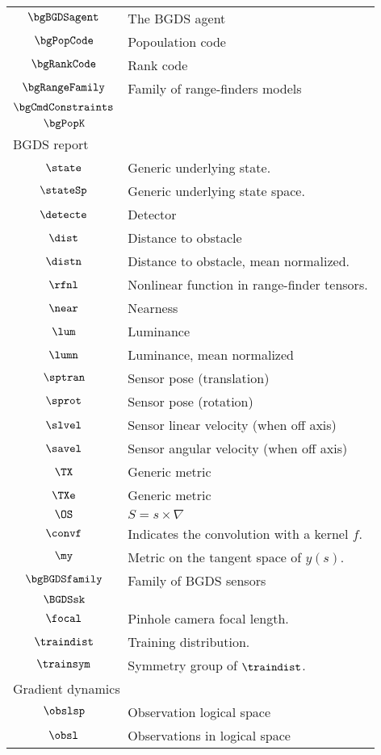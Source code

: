 \begin{longtable}{cl}
 $\bgBGDSagent$ &  The BGDS agent\\ 
 $\bgPopCode$ &  Popoulation code\\ 
 $\bgRankCode$ &  Rank code\\ 
 $\bgRangeFamily$ &  Family of range-finders models\\ 
 $\bgCmdConstraints$ & \\ 
 $\bgPopK$ & \\ 
 \multicolumn{2}{l}{BGDS report}\\ 
 \hline
$\state$ &  Generic underlying state.\\ 
 $\stateSp$ &  Generic underlying state space.\\ 
 $\detecte$ &  Detector\\ 
 $\dist$ &  Distance to obstacle\\ 
 $\distn$ &  Distance to obstacle, mean normalized.\\ 
 $\rfnl$ &  Nonlinear function in range-finder tensors.\\ 
 $\near$ &  Nearness\\ 
 $\lum$ &  Luminance\\ 
 $\lumn$ &  Luminance, mean normalized\\ 
 $\sptran$ &  Sensor pose (translation)\\ 
 $\sprot$ &  Sensor pose (rotation)\\ 
 $\slvel$ &  Sensor linear velocity (when off axis)\\ 
 $\savel$ &  Sensor angular velocity (when off axis)\\ 
 $\TX$ &  Generic metric\\ 
 $\TXe$ &  Generic metric\\ 
 $\OS$ &  $S = s\times \nabla$\\ 
 $\convf$ &  Indicates the convolution with a kernel $f$.\\ 
 $\my$ &  Metric on the tangent space of $y(s)$.\\ 
 $\bgBGDSfamily$ &  Family of BGDS sensors\\ 
 $\BGDSsk$ & \\ 
 $\focal$ &  Pinhole camera focal length.\\ 
 $\traindist$ &  Training distribution.\\ 
 $\trainsym$ &  Symmetry group of $\traindist$.\\ 
 \multicolumn{2}{l}{Gradient dynamics}\\ 
 \hline
$\obslsp$ &  Observation logical space\\ 
 $\obsl$ &  Observations in logical space\\ 

\end{longtable}
